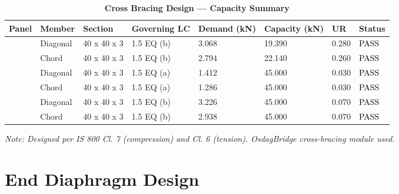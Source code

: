 \vspace{1em}
\begin{longtable}{|C{2.0cm}|L{1.8cm}|C{2.2cm}|C{3.0cm}|C{1.8cm}|C{1.8cm}|C{1.2cm}|C{1.8cm}|}
\caption{\textbf{Cross Bracing Design --- Capacity Summary}}
\hline
\textbf{Panel} & \textbf{Member} & \textbf{Section} & \textbf{Governing LC} & \textbf{Demand (kN)} & \textbf{Capacity (kN)} & \textbf{UR} & \textbf{Status} \\[6pt]
\hline
{} & Diagonal & 40 x 40 x 3 & 1.5 EQ (b) & 3.068 & 19.390 & 0.280 & \textcolor{black}{PASS} \\[6pt]
 & Chord & 40 x 40 x 3 & 1.5 EQ (b) & 2.794 & 22.140 & 0.260 & \textcolor{black}{PASS} \\[6pt]
\hline
{} & Diagonal & 40 x 40 x 3 & 1.5 EQ (a) & 1.412 & 45.000 & 0.030 & \textcolor{black}{PASS} \\[6pt]
 & Chord & 40 x 40 x 3 & 1.5 EQ (a) & 1.286 & 45.000 & 0.030 & \textcolor{black}{PASS} \\[6pt]
\hline
{} & Diagonal & 40 x 40 x 3 & 1.5 EQ (b) & 3.226 & 45.000 & 0.070 & \textcolor{black}{PASS} \\[6pt]
 & Chord & 40 x 40 x 3 & 1.5 EQ (b) & 2.938 & 45.000 & 0.070 & \textcolor{black}{PASS} \\[6pt]
\hline
\end{longtable}
\noindent\textit{Note: Designed per IS 800 Cl. 7 (compression) and Cl. 6 (tension). OsdagBridge cross-bracing module used.}

\section{End Diaphragm Design}
